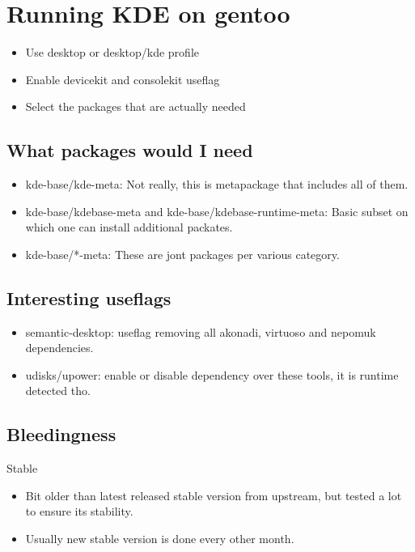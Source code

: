 \documentclass{beamer}
\begin{document}
\section{Running KDE on gentoo}
\begin{frame}
	\begin{itemize}
		\item Use desktop or desktop/kde profile
		\item Enable devicekit and consolekit useflag
		\item Select the packages that are actually needed
	\end{itemize}
\end{frame}

\subsection{What packages would I need}
\begin{frame}
	\begin{itemize}
		\item kde-base/kde-meta: Not really, this is metapackage that includes all of them.
		\item kde-base/kdebase-meta and kde-base/kdebase-runtime-meta: Basic subset on which one can install additional packates.
		\item kde-base/*-meta: These are jont packages per various category.
	\end{itemize}
\end{frame}

\subsection{Interesting useflags}
\begin{frame}
	\begin{itemize}
		\item semantic-desktop: useflag removing all akonadi, virtuoso and nepomuk dependencies.
		\item udisks/upower: enable or disable dependency over these tools, it is runtime detected tho.
	\end{itemize}
\end{frame}

\subsection{Bleedingness}
\begin{frame}
	\begin{center}Stable\end{center}
	\begin{itemize}
		\item Bit older than latest released stable version from upstream, but tested a lot to ensure its stability.
		\item Usually new stable version is done every other month.
	\end{itemize}
\end{frame}
\end{document}
